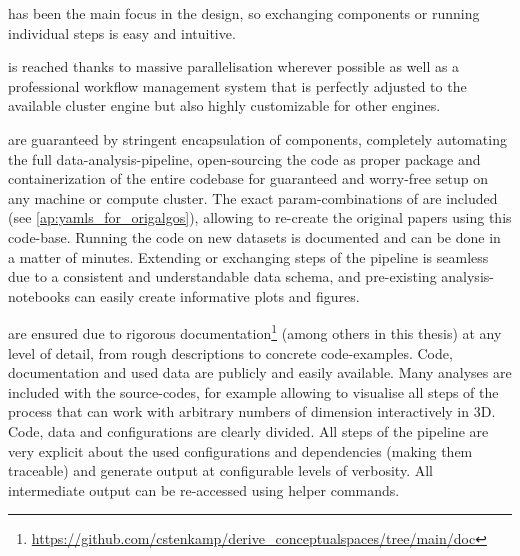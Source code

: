 \begin{description}[style=unboxed]
	\item[Modularity] has been the main focus in the design, so exchanging components or running individual steps is easy and intuitive.
	\item[Scalability] is reached thanks to massive parallelisation wherever possible as well as a professional workflow management system that is perfectly adjusted to the available cluster engine but also highly customizable for other engines.
	\item[Reproducibility and Adaptability] are guaranteed by stringent encapsulation of components, completely automating the full data-analysis-pipeline, open-sourcing the code as proper package and containerization of the entire codebase for guaranteed and worry-free setup on any machine or compute cluster. The exact \gls{param}-combinations of \mainalgos are included (see \autoref{ap:yamls_for_origalgos}), allowing to re-create the original papers using this code-base. Running the code on new datasets is documented and can be done in a matter of minutes. Extending or exchanging steps of the pipeline is seamless due to a consistent and understandable data schema, and pre-existing analysis-notebooks can easily create informative plots and figures.
	\item[Transparency and Understandability] are ensured due to rigorous documentation\footnote{\url{https://github.com/cstenkamp/derive_conceptualspaces/tree/main/doc}} (among others in this thesis) at any level of detail, from rough descriptions to concrete code-examples. Code, documentation and used data are publicly and easily available. Many analyses are included with the source-codes, for example allowing to visualise all steps of the process that can work with arbitrary numbers of dimension interactively in 3D. Code, data and configurations are clearly divided. All steps of the pipeline are very explicit about the used configurations and dependencies (making them traceable) and generate output at configurable levels of verbosity. All intermediate output can be re-accessed using helper commands.%
\end{description}




